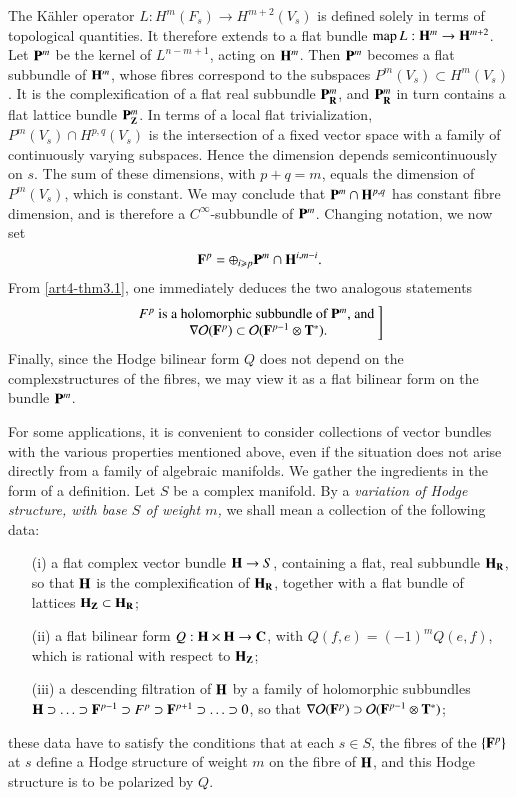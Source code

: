 The K\"{a}hler operator $L: H^m (F_s) \to H^{m+2} (V_s)$ is defined solely in terms of topological quantities.  It therefore extends to a flat bundle $\operatorname{map} L : \mathbf{H}^m \to \mathbf{H}^{m+2}$. Let $\mathbf{P}^m$ be the kernel of $L^{n-m+1}$, acting on $\mathbf{H}^m$. Then $\mathbf{P}^m$ becomes a flat subbundle of $\mathbf{H}^m$, whose fibres correspond to the subspaces $P^m (V_s) \subset H^m (V_s)$. It is the complexification of a flat real subbundle $\mathbf{P}^m_{\mathbf{R}}$, and $\mathbf{P}^m_{\mathbf{R}}$ in turn contains a flat lattice bundle $\mathbf{P}^m_{\mathbf{Z}}$. In terms of a local flat trivialization, $P^m(V_s) \cap H^{p,q} (V_s)$ is the intersection of a fixed vector space with a family of continuously varying subspaces. Hence the dimension depends semicontinuously on $s$. The sum of these dimensions, with $p + q = m$, equals the dimension of $P^m (V_s)$, which is constant. We may conclude that $\mathbf{P}^m \cap \mathbf{H}^{p,q}$ has constant fibre dimension, and is therefore a $C^\infty$-subbundle of $\mathbf{P}^m$. Changing notation, we now set
$$
\mathbf{F}^p = \oplus_{i \geqslant p} \mathbf{P}^m \cap \mathbf{H}^{i, m-i}.
$$
From \eqref{art4-thm3.1}, one immediately deduces the two analogous statements
\setcounter{equation}{1}
\begin{equation}
\left.
\begin{matrix}
F^p \text{ is  a holomorphic subbundle of $\mathbf{P}^m$, and }\\
\nabla \mathcal{O} (\mathbf{F}^p) \subset \mathcal{O} (\mathbf{F}^{p-1} \otimes \mathbf{T}^\ast). 
\end{matrix}\right] \label{art4-eq3.2}
\end{equation}
Finally, since the Hodge bilinear form $Q$ does not depend on the complex\pageoriginale structures of the fibres, we may view it as a flat bilinear form on the bundle $\mathbf{P}^m$.

For some applications, it is convenient to consider collections of vector bundles with the various properties mentioned above, even if the situation does not arise directly from a family of algebraic manifolds. We gather the ingredients in the form of a definition. Let $S$ be a complex manifold. By a \textit{variation of Hodge structure, with base $S$ of weight $m$,} we shall mean a collection of the following data: 
\begin{itemize}
\item[(i)] a flat complex vector bundle $\mathbf{H} \to S$, containing a flat, real subbundle $\mathbf{H}_{\mathbf{R}}$, so that $\mathbf{H}$ is the complexification of $\mathbf{H}_{\mathbf{R}}$, together with a flat bundle of lattices $\mathbf{H}_{\mathbf{Z}} \subset \mathbf{H}_{\mathbf{R}}$;

\item[(ii)] a flat bilinear form $Q : \mathbf{H} \times \mathbf{H} \to \mathbf{C}$, with $Q (f, e) = (-1)^m Q (e,f)$, which is rational with respect to $\mathbf{H}_{\mathbf{Z}}$;

\item[(iii)] a descending filtration of $\mathbf{H}$ by a family of holomorphic subbundles $\mathbf{H} \supset \ldots \supset \mathbf{F}^{p-1} \supset F^p \supset \mathbf{F}^{p+1} \supset \ldots \supset 0$, so that $\nabla \mathcal{O} (\mathbf{F}^p) \supset \mathcal{O} (\mathbf{F}^{p-1} \otimes \mathbf{T}^{\ast})$; 
\end{itemize}
these data have to satisfy the conditions that at each $s \in S$, the fibres of the $\{\mathbf{F}^p\}$ at $s$ define a Hodge structure of weight $m$ on the fibre of $\mathbf{H}$, and this Hodge structure is to be polarized by $Q$.

